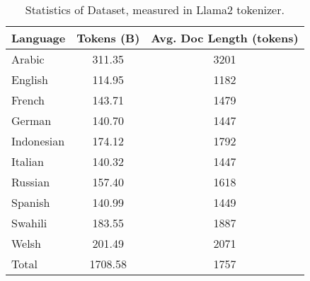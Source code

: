 \begin{table}[!t]
\small
\centering
\begin{tabular}{l|cc}
\toprule
Language & \multicolumn{1}{c}{Tokens (B)} & \multicolumn{1}{c}{Avg. Doc Length (tokens)} \\
\midrule
Arabic	&	311.35	&	3201	\\
English	&	114.95	&	1182	\\
French	&	143.71	&	1479	\\
German	&	140.70	&	1447	\\
Indonesian	&	174.12	&	1792	\\
Italian	&	140.32	&	1447	\\
Russian	&	157.40	&	1618	\\
Spanish	&	140.99	&	1449	\\
Swahili	&	183.55	&	1887	\\
Welsh	&	201.49	&	2071	\\
\midrule
Total & 1708.58 & 1757 \\
\bottomrule
\end{tabular}
\caption{Statistics of \thedata Dataset, measured in Llama2 tokenizer.}
\label{tab:nllb_statistics}
\end{table}